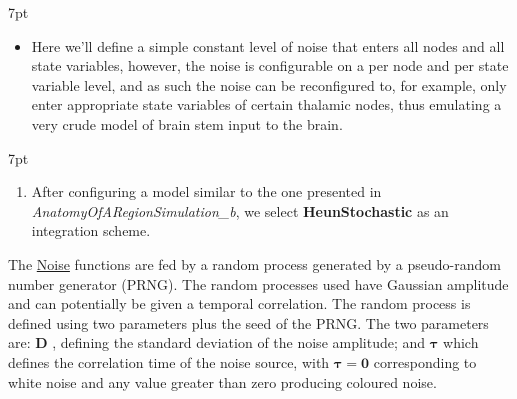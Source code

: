\documentclass{tufte-handout}
\newenvironment{simulation}{%
  \def\FrameCommand{%
    \hspace{1pt}%
    {\color{ForestGreen}\vrule width 2pt}%
    {\color{simulationshade}\vrule width 4pt}%
    \colorbox{simulationshade}%
  }%
  \MakeFramed{\advance\hsize-\width\FrameRestore}%
  \noindent\hspace{-4.55pt}%
  \begin{adjustwidth}{}{7pt}%
  \vspace{2pt}\vspace{2pt}%
}
{%
  \vspace{2pt}\end{adjustwidth}\endMakeFramed%
}
\newenvironment{blah}{%
  \def\FrameCommand{%
    \hspace{1pt}%
    {\color{DarkOrange}\vrule width 2pt}%
    {\color{PeachPuff}\vrule width 4pt}%
    \colorbox{PeachPuff}%
  }%
  \MakeFramed{\advance\hsize-\width\FrameRestore}%
  \noindent\hspace{-4.55pt}%
  \begin{adjustwidth}{}{7pt}%
  \vspace{2pt}\vspace{2pt}%
}
{%
  \vspace{2pt}\end{adjustwidth}\endMakeFramed%
}
\begin{document}
\begin{blah}
\begin{itemize}
\item Here we'll define a simple constant level of noise that enters all
nodes and all state variables, however, the noise is configurable on a per
node and per state variable level, and as such the noise can be reconfigured
to, for example, only enter appropriate state variables of certain thalamic
nodes, thus emulating a very crude model of brain stem input to the brain. 
\end{itemize}
\end{blah}

\begin{simulation}
\begin{enumerate}
\item After configuring a model similar to the one presented in  \textit{AnatomyOfARegionSimulation\_b}, we select \textbf{HeunStochastic} as an integration scheme.  
\end{enumerate}
\end{simulation}

The \underline{Noise} functions are fed by a
random process generated by a pseudo-random number generator (PRNG). The random
processes used have Gaussian amplitude and can potentially be given a temporal
correlation. The random process is defined using two
parameters plus the seed of the PRNG. The two parameters are: $\mathbf{D}$ , defining the
standard deviation of the noise amplitude; and $\mathbf{{\tau}}$ which defines the
correlation time of the noise source, with $\mathbf{\tau = 0}$ corresponding to white
noise and any value greater than zero producing coloured noise. 
\end{document}
